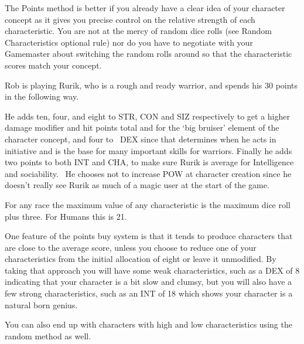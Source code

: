 The Points method is better if you already have a clear idea of your character concept as it gives you precise control on the relative strength of each characteristic. You are not at the mercy of random dice rolls (see Random Characteristics optional rule) nor do you have to negotiate with your Gamemaster about switching the random rolls around so that the characteristic scores match your concept.

\begin{rpg-examplebox}
Rob is playing Rurik, who is a rough and ready warrior, and spends his 30 points in the following way.

	\stats[STR=18, CON=12, DEX=12, SIZ=16, INT=10, POW=8, CHA=10]

He adds ten, four, and eight to STR, CON and SIZ respectively to get a higher damage modifier and hit points total and for the ‘big bruiser’ element of the character concept, and four to  DEX since that determines when he acts in initiative and is the base for many important skills for warriors. Finally he adds two points to both INT and CHA, to make sure Rurik is average for Intelligence and sociability.  He chooses not to increase POW at character creation since he doesn’t really see Rurik as much of a magic user at the start of the game.
\end{rpg-examplebox}

For any race the maximum value of any characteristic is the maximum dice roll plus three. For Humans this is 21.

One feature of the points buy system is that it tends to produce characters that are close to the average score, unless you choose to reduce one of your characteristics from the initial allocation of eight or leave it unmodified. By taking that approach you will have some weak characteristics, such as a DEX of 8 indicating that your character is a bit slow and clumsy, but you will also have a few strong characteristics, such as an INT of 18 which shows your character is a natural born genius. 

You can also end up with characters with high and low characteristics using the random method as well.

